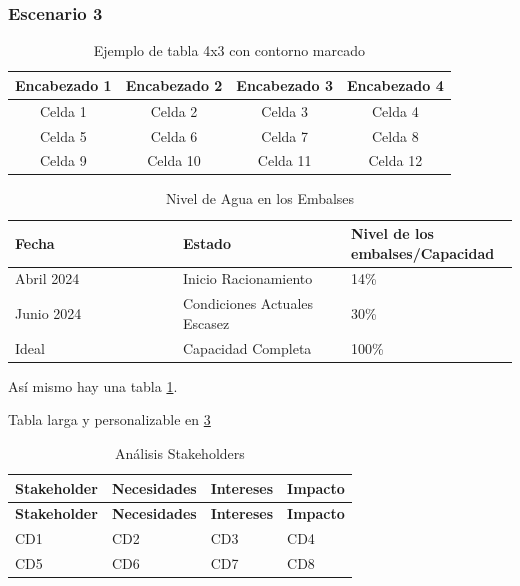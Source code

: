 \documentclass{article}
\begin{document}
\subsubsection{Escenario 3}


\renewcommand{\tablename}{Tabla}
\begin{table}[htbp]
  \centering
  \caption{Ejemplo de tabla 4x3 con contorno marcado \label{tab:Prueba}}
  \begin{tabular}{|c|c|c|c|} %
    \hline
    Encabezado 1 & Encabezado 2 & Encabezado 3 & Encabezado 4 \\
    \hline
    Celda 1 & Celda 2 & Celda 3 & Celda 4 \\
    \hline
    Celda 5 & Celda 6 & Celda 7 & Celda 8 \\
    \hline
    Celda 9 & Celda 10 & Celda 11 & Celda 12 \\
    \hline
  \end{tabular}
\end{table}

\begin{table}[H]
\centering
\caption{Nivel de Agua en los Embalses}
\label{tab:NivelAgua}
\begin{tabular}{|p{0.333\linewidth}|p{0.333\linewidth}|p{0.333\linewidth}|}
\hline
\textbf{Fecha} & \textbf{Estado} & \textbf{Nivel de los embalses/Capacidad} \\
\hline
Abril 2024 & Inicio Racionamiento & 14\% \\
\hline
Junio 2024 & Condiciones Actuales Escasez & 30\% \\
\hline
Ideal & Capacidad Completa & 100\% \\
\hline
\end{tabular}
\end{table}

Así mismo hay una tabla \ref{tab:Prueba}.

Tabla larga y personalizable en \ref{tab:anaTab}

\renewcommand{\tablename}{Tabla}
\begin{longtable}{|p{3.5cm}|p{3cm}|p{3cm}|p{5cm}|} %
  \caption{Análisis Stakeholders\label{tab:anaTab}} \\
  \hline
  \textbf{Stakeholder} & \textbf{Necesidades} & \textbf{Intereses} & \textbf{Impacto} \\
  \hline
  \endfirsthead %
  \hline
  \textbf{Stakeholder} & \textbf{Necesidades} & \textbf{Intereses} & \textbf{Impacto} \\
  \hline
  \endhead %
  CD1 & CD2 & CD3 & CD4 \\
  \hline
  CD5 & CD6 & CD7 & CD8 \\
  \hline
\end{longtable}
\end{document}
